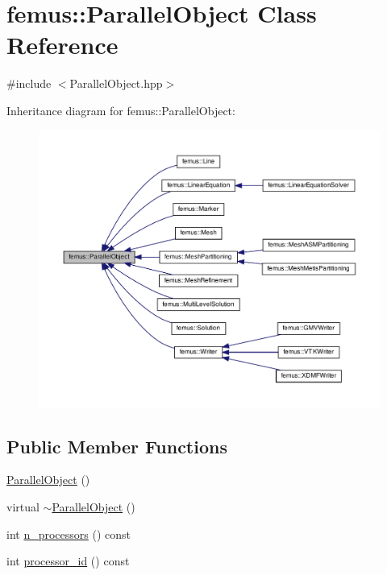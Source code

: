\hypertarget{classfemus_1_1_parallel_object}{}\section{femus\+:\+:Parallel\+Object Class Reference}
\label{classfemus_1_1_parallel_object}


{\ttfamily \#include $<$Parallel\+Object.\+hpp$>$}



Inheritance diagram for femus\+:\+:Parallel\+Object\+:
\nopagebreak
\begin{figure}[H]
\begin{center}
\leavevmode
\includegraphics[width=350pt]{classfemus_1_1_parallel_object__inherit__graph}
\end{center}
\end{figure}
\subsection*{Public Member Functions}
\begin{DoxyCompactItemize}
\item 
\mbox{\hyperlink{classfemus_1_1_parallel_object_a5c6144ef5cf48fe2602f4bfba53b627e}{Parallel\+Object}} ()
\item 
virtual \mbox{\hyperlink{classfemus_1_1_parallel_object_afbaa2c5604bf30e1f0ad164ec50970c8}{$\sim$\+Parallel\+Object}} ()
\item 
int \mbox{\hyperlink{classfemus_1_1_parallel_object_af6629fca51be192be664c76eb8aecc79}{n\+\_\+processors}} () const
\item 
int \mbox{\hyperlink{classfemus_1_1_parallel_object_a6438b3ffcc8cde2d6ccfb4ec563dfce1}{processor\+\_\+id}} () const
\end{DoxyCompactItemize}
